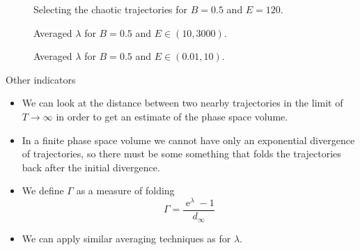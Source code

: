 \documentclass{beamer}
\newcommand{\ee}{\operatorname{e}}          %
\begin{document}

\begin{frame}
	\begin{figure}
		
		\caption{Selecting the chaotic trajectories for \(B=0.5\)
		and \(E=120\).}
	\end{figure}
\end{frame}


\begin{frame}
	\begin{figure}
		
		\caption{Averaged \(\lambda\) for \(B=0.5\) and \(E \in (10, 3000)\).}
	\end{figure}
\end{frame}


\begin{frame}
	\begin{figure}
		
		\caption{Averaged \(\lambda\) for \(B=0.5\) and \(E \in (0.01, 10)\).}
	\end{figure}
\end{frame}


\begin{frame}{Other indicators}
	\begin{itemize}
		\item We can look at the distance between two nearby
		trajectories in the limit of \(T \to \infty\) in order to
		get an estimate of the phase space volume.
		\item In a finite phase space volume we cannot have only an
		exponential divergence of trajectories, so there must be some
		something that folds the trajectories back after the initial
		divergence.
		\item We define \(\Gamma\) as a measure of folding
		\[
		\Gamma = \frac{\ee^\lambda - 1}{d_\infty}
		\]
		\item We can apply similar averaging techniques as for \(\lambda\).

	\end{itemize}
\end{frame}
\end{document}
